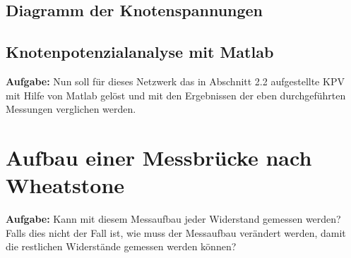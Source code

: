 \documentclass[10pt]{report}
\begin{document}
        \subsection{Diagramm der Knotenspannungen}
        \begin{center}
        \end{center}

        \subsection{Knotenpotenzialanalyse mit Matlab}
        \textbf{Aufgabe:} Nun soll für dieses Netzwerk das in Abschnitt 2.2 aufgestellte KPV mit Hilfe von Matlab
        gelöst und mit den Ergebnissen der eben durchgeführten Messungen verglichen werden.

        \vspace{0.5cm}


        \section{Aufbau einer Messbrücke nach Wheatstone}
        \textbf{Aufgabe:} Kann mit diesem Messaufbau jeder Widerstand gemessen werden? Falls dies nicht der
        Fall ist, wie muss der Messaufbau verändert werden, damit die restlichen Widerstände
        gemessen werden können?

        \vspace{0.5cm}

\end{document}
